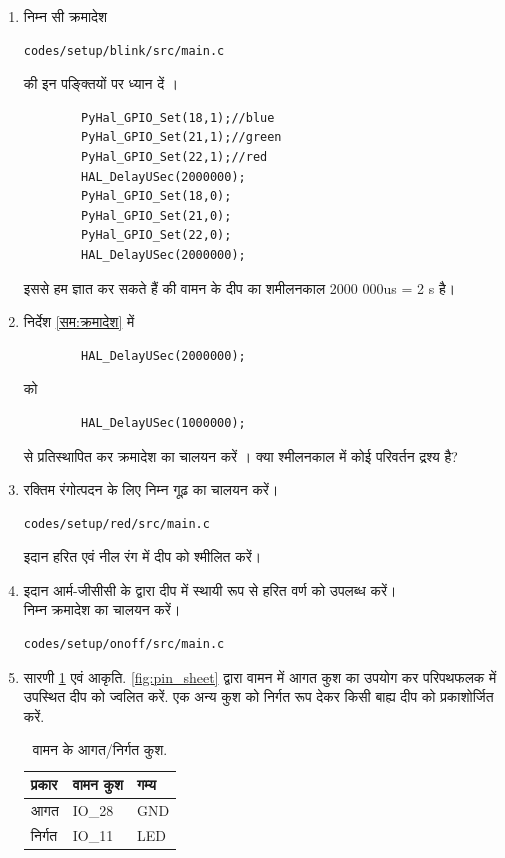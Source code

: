 \documentclass[journal,12pt,twocolumn]{IEEEtran}
\renewcommand\thesection{\arabic{section}}
\begin{document}
\renewcommand{\theequation}{\theenumi}
\renewcommand{\thefigure}{\theenumi}
\begin{enumerate}[label=\thesection.\arabic*.,ref=\thesection.\theenumi]
\item निम्न सी क्रमादेश
\label{सम:क्रमादेश}
\begin{lstlisting}
codes/setup/blink/src/main.c
\end{lstlisting}
की  इन पङ्क्तियों पर ध्यान दें । 
%
\begin{lstlisting}
        PyHal_GPIO_Set(18,1);//blue
        PyHal_GPIO_Set(21,1);//green
        PyHal_GPIO_Set(22,1);//red
        HAL_DelayUSec(2000000);    
        PyHal_GPIO_Set(18,0);
        PyHal_GPIO_Set(21,0);
        PyHal_GPIO_Set(22,0);
        HAL_DelayUSec(2000000);    
\end{lstlisting}
%
इससे हम ज्ञात कर सकते हैं की वामन के दीप का शमीलनकाल 2000 000us = 2 s है।  
\item निर्देश \ref{सम:क्रमादेश} में 
\label{सम:द्विआधार}
\begin{lstlisting}
        HAL_DelayUSec(2000000);
\end{lstlisting}
%
को 
\begin{lstlisting}
        HAL_DelayUSec(1000000);
\end{lstlisting}
से प्रतिस्थापित कर क्रमादेश का चालयन करें ।  क्या श्मीलनकाल में कोई परिवर्तन द्रश्य है?
\item रक्तिम रंगोत्पदन के लिए निम्न गूढ़ का चालयन करें।  
\begin{lstlisting}
codes/setup/red/src/main.c
\end{lstlisting}
इदान हरित एवं नील रंग में दीप को श्मीलित करें।

\item इदान  आर्म-जीसीसी  के द्वारा दीप में स्थायी रूप से  हरित वर्ण को उपलब्ध करें।
\\
\solution निम्न क्रमादेश का चालयन करें।
\begin{lstlisting}
codes/setup/onoff/src/main.c
\end{lstlisting}
\item  सारणी \ref{table:input} एवं आकृति. \ref{fig:pin_sheet} द्वारा वामन में आगत कुश का उपयोग कर परिपथफलक में उपस्थित दीप
को ज्वलित करें.  एक अन्य कुश को निर्गत रूप देकर किसी बाह्य दीप को प्रकाशोर्जित करें.

\begin{table}[]
\centering
\begin{tabular}{|l|l|l|}
\hline
प्रकार & वामन कुश  &  गम्य \\ \hline
आगत &  IO\_28 &  GND\\ \hline
निर्गत  & IO\_11  &  LED\\ \hline
\end{tabular}
\caption{वामन के आगत/निर्गत कुश.}
\label{table:input}
\end{table}


\end{enumerate}
\end{document}
